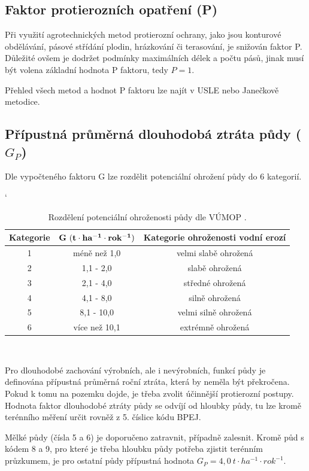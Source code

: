 \subsection{Faktor protierozních opatření (P)}
Při využití agrotechnických metod protierozní ochrany, jako jsou
konturové obdělávání, pásové střídání plodin, hrázkování či
terasování, je snižován faktor P. Důležité ovšem je dodržet podmínky
maximálních délek a počtu pásů, jinak musí být volena základní hodnota
P faktoru, tedy $P=1$.

Přehled všech metod a hodnot P faktoru lze najít v USLE\cite{usle1978}
nebo Janečkově metodice\cite{janecek2012}.

\subsection{Přípustná průměrná dlouhodobá ztráta půdy ($G_P$)}
Dle vypočteného faktoru G lze rozdělit potenciální ohrožení půdy do 6
kategorií.\cite{vumop}

\begin{table}[!h]
\begin{center}
\catcode`
    \noindent\begin{tabular}{|*{3}{c|}} \hline \bf Kategorie & \bf
    $\bf G~(t\cdot ha^{-1}\cdot rok^{-1})$ & \bf Kategorie ohroženosti
    vodní erozí\\ \hline 1 & méně než 1,0 & velmi slabě
    ohrožená\\ \hline 2 & 1,1 - 2,0 & slabě ohrožená\\ \hline 3 & 2,1
    - 4,0 & středné ohrožená\\ \hline 4 & 4,1 - 8,0 & silně
    ohrožená\\ \hline 5 & 8,1 - 10,0 & velmi silně ohrožená\\ \hline 6
    & více než 10,1 & extrémně ohrožená\\ \hline
    \end{tabular}\\
  \caption[Rozdělení potenciální ohroženosti půdy]{Rozdělení
    potenciální ohroženosti půdy dle VÚMOP \cite{vumop}.}
  \label{tabulka_ohrozenost}
\end{center}
\end{table}
\FloatBarrier Pro dlouhodobé zachování výrobních, ale i nevýrobních,
funkcí půdy je definována přípustná průměrná roční ztráta, která by
neměla být překročena. Pokud k tomu na pozemku dojde, je třeba zvolit
účinnější protierozní postupy. Hodnota faktor dlouhodobé ztráty půdy
se odvíjí od hloubky půdy, tu lze kromě terénního měření určit rovněž
z 5. číslice kódu BPEJ.\cite{janecek2012}

Mělké půdy (čísla 5 a 6) je doporučeno zatravnit, případně
zalesnit. Kromě půd s kódem 8 a 9, pro které je třeba hloubku půdy
potřeba zjistit terénním průzkumem, je pro ostatní půdy přípustná
hodnota $G_P=4,0~t\cdot ha^{-1}\cdot rok^{-1}$.\cite{Novotny2014}
